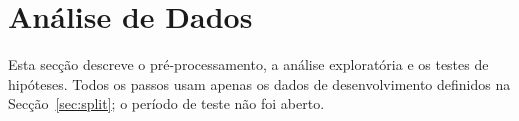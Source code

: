 
\section{Análise de Dados}
\label{sec:analise}

Esta secção descreve o pré-processamento, a análise exploratória e os testes de
hipóteses. Todos os passos usam apenas os dados de desenvolvimento definidos na
Secção~\ref{sec:split}; o período de teste não foi aberto.




